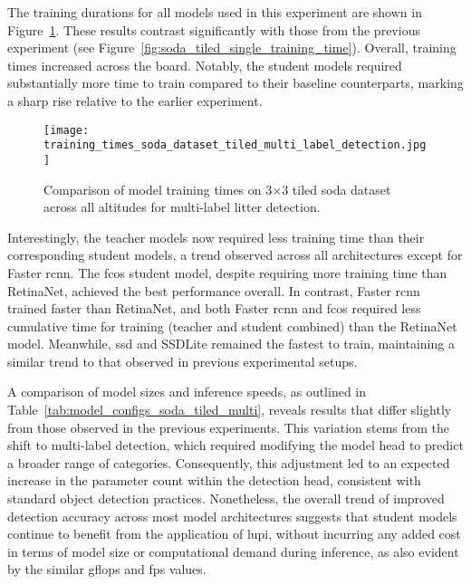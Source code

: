 The training durations for all models used in this experiment are shown in Figure~\ref{fig:soda_tiled_multi_training_time}. These results contrast significantly with those from the previous experiment (see Figure~\ref{fig:soda_tiled_single_training_time}). Overall, training times increased across the board. Notably, the student models required substantially more time to train compared to their baseline counterparts, marking a sharp rise relative to the earlier experiment.

\begin{figure}[!ht]
    \centering
    \texttt{[image: training\_times\_soda\_dataset\_tiled\_multi\_label\_detection.jpg]}
    \caption{Comparison of model training times on 3$\times$3 tiled \gls{soda} dataset across all altitudes for multi-label litter detection.}
    \label{fig:soda_tiled_multi_training_time}
\end{figure}

Interestingly, the teacher models now required less training time than their corresponding student models, a trend observed across all architectures except for Faster \gls{rcnn}. The \gls{fcos} student model, despite requiring more training time than RetinaNet, achieved the best performance overall. In contrast, Faster \gls{rcnn} trained faster than RetinaNet, and both Faster \gls{rcnn} and \gls{fcos} required less cumulative time for training (teacher and student combined) than the RetinaNet model. Meanwhile, \gls{ssd} and SSDLite remained the fastest to train, maintaining a similar trend to that observed in previous experimental setups.

A comparison of model sizes and inference speeds, as outlined in Table~\ref{tab:model_configs_soda_tiled_multi}, reveals results that differ slightly from those observed in the previous experiments. This variation stems from the shift to multi-label detection, which required modifying the model head to predict a broader range of categories. Consequently, this adjustment led to an expected increase in the parameter count within the detection head, consistent with standard object detection practices. Nonetheless, the overall trend of improved detection accuracy across most model architectures suggests that student models continue to benefit from the application of \gls{lupi}, without incurring any added cost in terms of model size or computational demand during inference, as also evident by the similar \gls{gflops} and \gls{fps} values.

